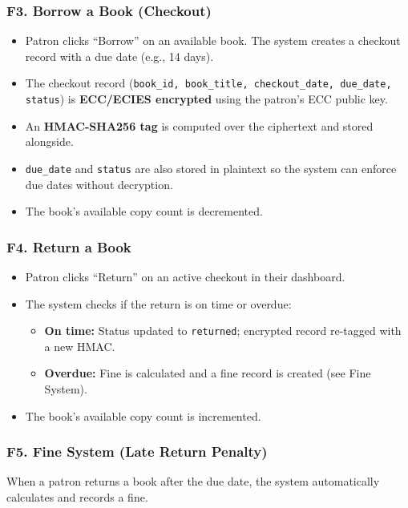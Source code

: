 \documentclass[12pt]{article}
\begin{document}
\subsubsection{F3. Borrow a Book (Checkout)}
\begin{itemize}
    \item Patron clicks ``Borrow'' on an available book. The system creates a checkout record with a due date (e.g., 14 days).
    \item The checkout record (\texttt{book\_id, book\_title, checkout\_date, due\_date, status}) is \textbf{ECC/ECIES encrypted} using the patron's ECC public key.
    \item An \textbf{HMAC-SHA256 tag} is computed over the ciphertext and stored alongside.
    \item \texttt{due\_date} and \texttt{status} are also stored in plaintext so the system can enforce due dates without decryption.
    \item The book's available copy count is decremented.
\end{itemize}

\subsubsection{F4. Return a Book}
\begin{itemize}
    \item Patron clicks ``Return'' on an active checkout in their dashboard.
    \item The system checks if the return is on time or overdue:
    \begin{itemize}
        \item \textbf{On time:} Status updated to \texttt{returned}; encrypted record re-tagged with a new HMAC.
        \item \textbf{Overdue:} Fine is calculated and a fine record is created (see Fine System).
    \end{itemize}
    \item The book's available copy count is incremented.
\end{itemize}

\subsubsection{F5. Fine System (Late Return Penalty)}

When a patron returns a book after the due date, the system automatically calculates and records a fine.
\end{document}
